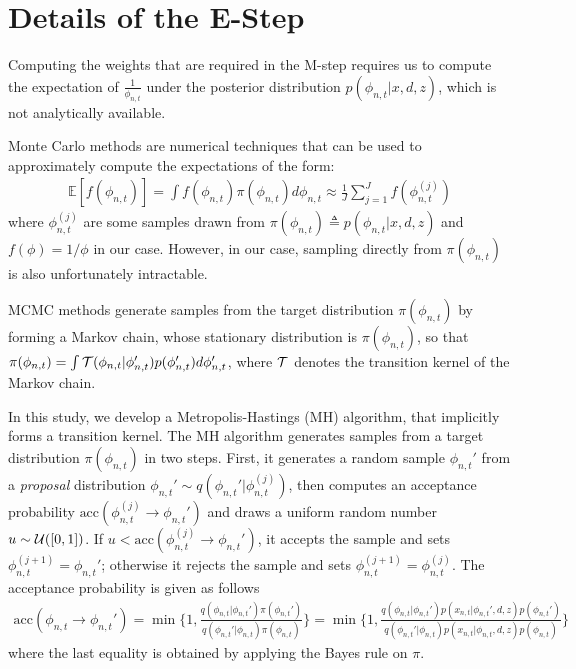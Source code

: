 \section{Details of the E-Step}


Computing the weights that are required in the M-step requires us to compute the expectation of $\frac1{\phi_{n,t}}$ under the posterior distribution $p(\phi_{n,t}|x,d,z)$, which is not analytically available. 

Monte Carlo methods are numerical techniques that can be used to approximately compute the expectations of the form:
\begin{align}
\mathds{E}[f(\phi_{n,t})] = \int f(\phi_{n,t}) \pi(\phi_{n,t}) d\phi_{n,t} \approx \frac1{J} \sum_{j=1}^J f(\phi_{n,t}^{(j)}) \label{eqn:mc}
\end{align}
where $\phi_{n,t}^{(j)}$ are some samples drawn from $\pi(\phi_{n,t}) \triangleq p(\phi_{n,t}|x,d,z)$ and $f(\phi) = 1/\phi$ in our case. However, in our case, sampling directly from $\pi(\phi_{n,t})$ is also unfortunately intractable.


\ac{MCMC} methods generate samples from the target distribution $\pi(\phi_{n,t})$ by forming a Markov chain, whose stationary distribution is $\pi(\phi_{n,t})$, 
%
so that $\pi(\phi_{n,t}) = \int {\cal T}(\phi_{n,t}|\phi_{n,t}') p(\phi_{n,t}') d\phi_{n,t}'$, where ${\cal T}$ denotes the transition kernel of the Markov chain. 

In this study, we develop a Metropolis-Hastings (MH) algorithm, that implicitly forms a transition kernel. 
%
The MH algorithm generates samples from a target distribution $\pi(\phi_{n,t})$ in two steps. First, it generates a random sample $\phi_{n,t}'$ from a \emph{proposal} distribution $\phi_{n,t}' \sim q(\phi_{n,t}'|\phi_{n,t}^{(j)})$, then computes an acceptance probability $\text{acc}(\phi_{n,t}^{(j)} \rightarrow \phi_{n,t}')$ and draws a uniform random number $u \sim {\cal U}([0, 1])$. If $u < \text{acc}(\phi_{n,t}^{(j)} \rightarrow \phi_{n,t}')$, it accepts the sample and sets $\phi_{n,t}^{(j+1)} = \phi_{n,t}'$; otherwise it rejects the sample and sets $\phi_{n,t}^{(j+1)} = \phi_{n,t}^{(j)}$. The acceptance probability is given as follows
\begin{align}
\text{acc}(\phi_{n,t} \rightarrow \phi_{n,t}') = \min \Bigr\{1, \frac{q(\phi_{n,t}|\phi_{n,t}') \pi(\phi_{n,t}')}{q(\phi_{n,t}'|\phi_{n,t}) \pi(\phi_{n,t})}\Bigr\} = \min \Bigr\{1, \frac{q(\phi_{n,t}|\phi_{n,t}') p(x_{n,t}|\phi_{n,t}',d,z) p(\phi_{n,t}') }{q(\phi_{n,t}'|\phi_{n,t}) p(x_{n,t}|\phi_{n,t},d,z) p(\phi_{n,t}) }\Bigr\}
\end{align}
where the last equality is obtained by applying the Bayes rule on $\pi$. 


